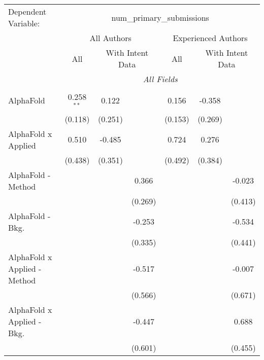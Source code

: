 \begingroup
\centering
\begin{tabular}{lcccccc}
   \tabularnewline \midrule \midrule
   Dependent Variable: & \multicolumn{6}{c}{num\_primary\_submissions}\\
 & \multicolumn{3}{c}{All Authors} & \multicolumn{3}{c}{Experienced Authors} \\
\cmidrule(lr){2-4} \cmidrule(lr){5-7}
 & \multicolumn{1}{c}{All} & \multicolumn{2}{c}{With Intent Data} & \multicolumn{1}{c}{All} & \multicolumn{2}{c}{With Intent Data} \\
\cmidrule(lr){2-2} \cmidrule(lr){3-4} \cmidrule(lr){5-5} \cmidrule(lr){6-7}
 & \multicolumn{6}{c}{\textit{All Fields}} \\ \\
   AlphaFold                      & 0.258$^{**}$ & 0.122        &               & 0.156          & -0.358        &   \\   
                                  & (0.118)      & (0.251)      &               & (0.153)        & (0.269)       &   \\   
   AlphaFold x Applied            & 0.510        & -0.485       &               & 0.724          & 0.276         &   \\   
                                  & (0.438)      & (0.351)      &               & (0.492)        & (0.384)       &   \\   
   AlphaFold - Method             &              &              & 0.366         &                &               & -0.023\\   
                                  &              &              & (0.269)       &                &               & (0.413)\\   
   AlphaFold - Bkg.               &              &              & -0.253        &                &               & -0.534\\   
                                  &              &              & (0.335)       &                &               & (0.441)\\   
   AlphaFold x Applied - Method   &              &              & -0.517        &                &               & -0.007\\   
                                  &              &              & (0.566)       &                &               & (0.671)\\   
   AlphaFold x Applied - Bkg.     &              &              & -0.447        &                &               & 0.688\\   
                                  &              &              & (0.601)       &                &               & (0.455)\\   

\end{tabular}
